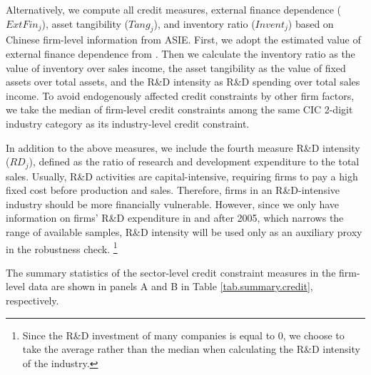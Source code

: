 Alternatively, we compute all credit measures, external finance dependence ($ExtFin_j$), asset tangibility ($Tang_j$), and inventory ratio ($Invent_j$) based on Chinese firm-level information from ASIE. First, we adopt the estimated value of external finance dependence from \cite{fan-lai-li2015}. Then we calculate the inventory ratio as the value of inventory over sales income, the asset tangibility as the value of fixed assets over total assets, and the R\&D intensity as R\&D spending over total sales income. To avoid endogenously affected credit constraints by other firm factors, we take the median of firm-level credit constraints among the same CIC 2-digit industry category as its industry-level credit constraint. 

In addition to the above measures, we include the fourth measure R\&D intensity ($RD_j$), defined as the ratio of research and development expenditure to the total sales. Usually, R\&D activities are capital-intensive, requiring firms to pay a high fixed cost before production and sales. Therefore, firms in an R\&D-intensive industry should be more financially vulnerable. However, since we only have information on firms' R\&D expenditure in and after 2005, which narrows the range of available samples, R\&D intensity will be used only as an auxiliary proxy in the robustness check. \footnote{Since the R\&D investment of many companies is equal to 0, we choose to take the average rather than the median when calculating the R\&D intensity of the industry.}

The summary statistics of the sector-level credit constraint measures in the firm-level data are shown in panels A and B in Table \ref{tab.summary.credit}, respectively.

